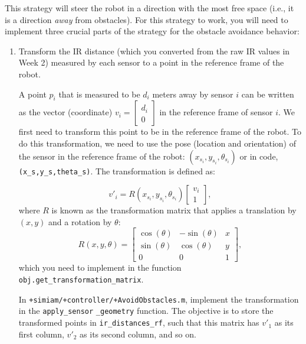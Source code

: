 \documentclass[10pt]{article}
\begin{document}
This strategy will steer the robot in a direction with the most free space (i.e., it is a direction \textit{away} from obstacles). For this strategy to work, you will need to implement three crucial parts of the strategy for the obstacle avoidance behavior:

\begin{enumerate}
  \item Transform the IR distance (which you converted from the raw IR values in Week 2) measured by each sensor to a point in the reference frame of the robot.
  
  A point $p_i$ that is measured to be $d_i$ meters away by sensor $i$ can be written as the vector (coordinate) $v_i=\begin{bmatrix}d_i \\ 0\end{bmatrix}$ in the reference frame of sensor $i$. We first need to transform this point to be in the reference frame of the robot. To do this transformation, we need to use the pose (location and orientation) of the sensor in the reference frame of the robot: $(x_{s_i},y_{s_i},\theta_{s_i})$ or in code, \texttt{(x\_s,y\_s,theta\_s)}. The transformation is defined as:
  
  \begin{equation*}
    v'_i = R(x_{s_i},y_{s_i},\theta_{s_i})\begin{bmatrix}v_i \\ 1\end{bmatrix},
  \end{equation*}
  where $R$ is known as the transformation matrix that applies a translation by $(x,y)$ and a rotation by $\theta$:
  \begin{equation*}
    R(x,y,\theta) = \begin{bmatrix}\cos(\theta) & -\sin(\theta) & x \\ 
                                   \sin(\theta) &  \cos(\theta) & y \\
                                             0 &            0 & 1\end{bmatrix},
  \end{equation*}
  which you need to implement in the function \texttt{obj.get\_transformation\_matrix}.
  
  In \texttt{+simiam/+controller/+AvoidObstacles.m}, implement the transformation in the \texttt{apply\_sensor} \texttt{\_geometry} function. The objective is to store the transformed points in \texttt{ir\_distances\_rf}, such that this matrix has $v'_1$ as its first column, $v'_2$ as its second column, and so on.
  

\end{enumerate}
\end{document}
